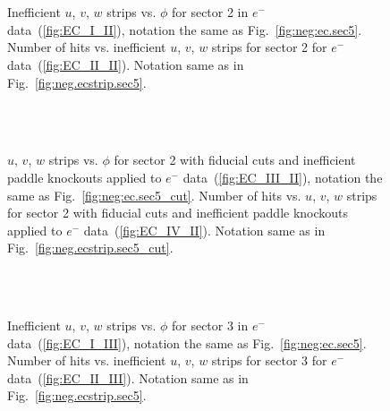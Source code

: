 \begin{figure}[!ht]
  \centering
   \quad
  \\
   \\

      \caption {Inefficient  $u$, $v$, $w$ strips vs. $\phi$ for sector 2 in  $e^{-} \ $ data~(\ref{fig:EC_I_II}), notation the same as Fig.~\ref{fig:neg:ec.sec5}. Number of hits vs. inefficient  $u$, $v$, $w$ strips for sector 2 for $e^-$ data~(\ref{fig:EC_II_II}). Notation same as in Fig.~\ref{fig:neg.ecstrip.sec5}.}
        \label{fig:EC_no_II}
\end{figure}



\begin{figure}[!ht]
  \centering
   \quad
  \\
   \\

      \caption { $u$, $v$, $w$ strips vs. $\phi$ for sector 2 with fiducial cuts and inefficient paddle knockouts applied to $e^-$ data~(\ref{fig:EC_III_II}), notation the same as Fig.~\ref{fig:neg:ec.sec5_cut}. Number of hits vs.  $u$, $v$, $w$ strips for sector 2 with fiducial cuts and inefficient paddle knockouts applied to $e^-$ data~(\ref{fig:EC_IV_II}). Notation same as in Fig.~\ref{fig:neg.ecstrip.sec5_cut}.}
        \label{fig:EC_cut_II}
\end{figure}


\begin{figure}[!ht]
  \centering
   \quad
  \\
   \\

      \caption {Inefficient  $u$, $v$, $w$ strips vs. $\phi$ for sector 3 in  $e^{-} \ $ data~(\ref{fig:EC_I_III}), notation the same as Fig.~\ref{fig:neg:ec.sec5}. Number of hits vs. inefficient  $u$, $v$, $w$ strips for sector 3 for $e^-$ data~(\ref{fig:EC_II_III}). Notation same as in Fig.~\ref{fig:neg.ecstrip.sec5}.}
        \label{fig:EC_no_III}
\end{figure}



